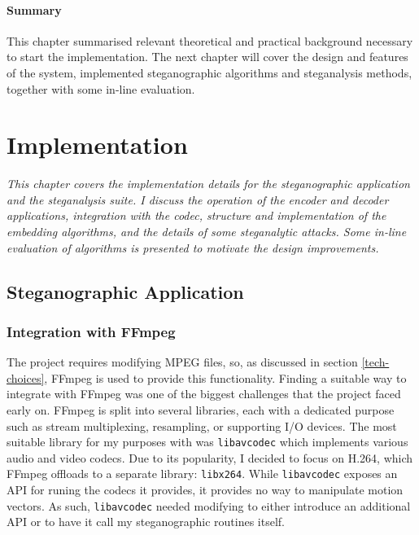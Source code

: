 \documentclass[12pt,british,twoside,notitlepage,usenames,dvipsnames,hypens,final]{report}
\numberwithin{equation}{section}
\numberwithin{figure}{section}
\begin{document}
\bigskip\bigskip
\subsubsection*{Summary}
This chapter summarised relevant theoretical and practical background necessary to start the implementation. The next chapter will cover the design and features of the system, implemented steganographic algorithms and steganalysis methods, together with some in-line evaluation.

\cleardoublepage
\chapter{Implementation}

\textit{This chapter covers the implementation details for the steganographic application and the steganalysis suite. I discuss the operation of the encoder and decoder applications, integration with the codec, structure and implementation of the embedding algorithms, and the details of some steganalytic attacks. Some in-line evaluation of algorithms is presented to motivate the design improvements.}

\section{Steganographic Application}

\subsection{Integration with FFmpeg}

The project requires modifying MPEG files, so, as discussed in section \ref{tech-choices}, FFmpeg is used to provide this functionality. Finding a suitable way to integrate with FFmpeg was one of the biggest challenges that the project faced early on. FFmpeg is split into several libraries, each with a dedicated purpose such as stream multiplexing, resampling, or supporting I/O devices. The most suitable library for my purposes with was \texttt{libavcodec} which implements various audio and video codecs. Due to its popularity, I decided to focus on H.264, which FFmpeg offloads to a separate library: \texttt{libx264}. While \texttt{libavcodec} exposes an API for runing the codecs it provides, it provides no way to manipulate motion vectors. As such, \texttt{libavcodec} needed modifying to either introduce an additional API or to have it call my steganographic routines itself.
\end{document}
